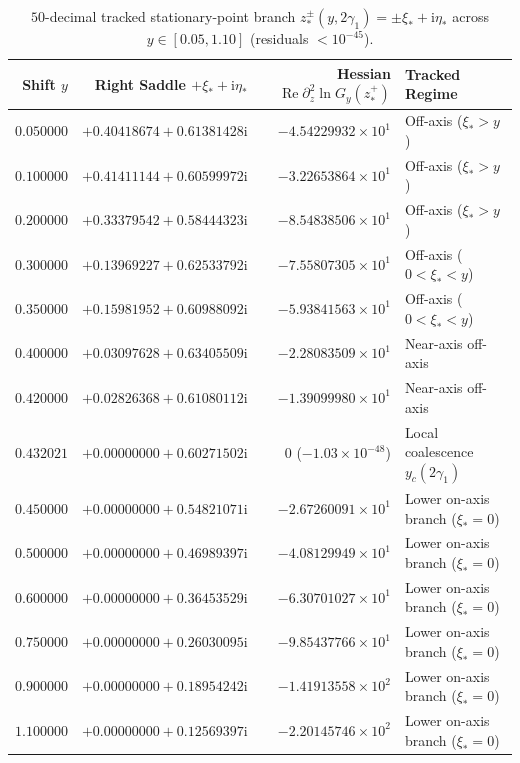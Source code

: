 \documentclass[11pt,a4paper,reqno]{amsart}
\theoremstyle{definition}
\theoremstyle{remark}
\numberwithin{equation}{section}
\newcommand{\ii}{\mathrm{i}}
\newcommand{\Rea}{\operatorname{Re}}
\begin{document}
\begin{table}[htbp]
\centering
\caption{$50$-decimal tracked stationary-point branch $z_*^\pm(y, 2\gamma_1) = \pm\xi_* + \ii\eta_*$ across $y \in [0.05, 1.10]$ (residuals $< 10^{-45}$).}\label{tab:saddle_trajectory}
\footnotesize
\begin{tabular}{rrrl}
\toprule
\textbf{Shift $y$} & \textbf{Right Saddle $+\xi_* + \ii\eta_*$} & \textbf{Hessian $\Rea\partial_z^2\ln G_y(z_*^+)$} & \textbf{Tracked Regime} \\
\midrule
$0.050000$ & $+0.40418674 + 0.61381428\ii$ & $-4.54229932 \times 10^{1}$ & Off-axis ($\xi_* > y$) \\
$0.100000$ & $+0.41411144 + 0.60599972\ii$ & $-3.22653864 \times 10^{1}$ & Off-axis ($\xi_* > y$) \\
$0.200000$ & $+0.33379542 + 0.58444323\ii$ & $-8.54838506 \times 10^{1}$ & Off-axis ($\xi_* > y$) \\
$0.300000$ & $+0.13969227 + 0.62533792\ii$ & $-7.55807305 \times 10^{1}$ & Off-axis ($0 < \xi_* < y$) \\
$0.350000$ & $+0.15981952 + 0.60988092\ii$ & $-5.93841563 \times 10^{1}$ & Off-axis ($0 < \xi_* < y$) \\
$0.400000$ & $+0.03097628 + 0.63405509\ii$ & $-2.28083509 \times 10^{1}$ & Near-axis off-axis \\
$0.420000$ & $+0.02826368 + 0.61080112\ii$ & $-1.39099980 \times 10^{1}$ & Near-axis off-axis \\
$0.432021$ & $+0.00000000 + 0.60271502\ii$ & $0$ ($-1.03 \times 10^{-48}$) & Local coalescence $y_c(2\gamma_1)$ \\
$0.450000$ & $+0.00000000 + 0.54821071\ii$ & $-2.67260091 \times 10^{1}$ & Lower on-axis branch ($\xi_* = 0$) \\
$0.500000$ & $+0.00000000 + 0.46989397\ii$ & $-4.08129949 \times 10^{1}$ & Lower on-axis branch ($\xi_* = 0$) \\
$0.600000$ & $+0.00000000 + 0.36453529\ii$ & $-6.30701027 \times 10^{1}$ & Lower on-axis branch ($\xi_* = 0$) \\
$0.750000$ & $+0.00000000 + 0.26030095\ii$ & $-9.85437766 \times 10^{1}$ & Lower on-axis branch ($\xi_* = 0$) \\
$0.900000$ & $+0.00000000 + 0.18954242\ii$ & $-1.41913558 \times 10^{2}$ & Lower on-axis branch ($\xi_* = 0$) \\
$1.100000$ & $+0.00000000 + 0.12569397\ii$ & $-2.20145746 \times 10^{2}$ & Lower on-axis branch ($\xi_* = 0$) \\
\bottomrule
\end{tabular}
\end{table}
\end{document}
